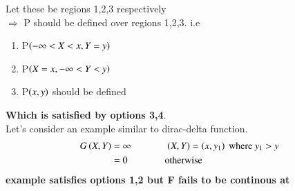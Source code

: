 \documentclass[journal,12pt,twocolumn]{IEEEtran}
\begin{document}
Let these be regions 1,2,3 respectively\\
$\Rightarrow$ P should be defined over regions 1,2,3. i.e
\begin{enumerate}
\item P$\left(-\infty<X<x,Y=y\right)$  
\item P$\left(X=x,-\infty<Y<y\right)$ 
\item P$\left(x,y\right) $ should be defined
\end{enumerate}
\textbf{Which is satisfied by options 3,4}.\\
Let's consider an example similar to dirac-delta function.
\begin{align}
G\left(X,Y\right)&=\infty \hspace{0.5in} \left(X,Y\right)=\left(x,y_1\right)\text{ where }y_1>y\nonumber \\
&=0 \hspace{0.5in} \text{ otherwise}
\end{align}
\textbf{example satisfies options 1,2 but F fails to be continous at }
\end{document}
